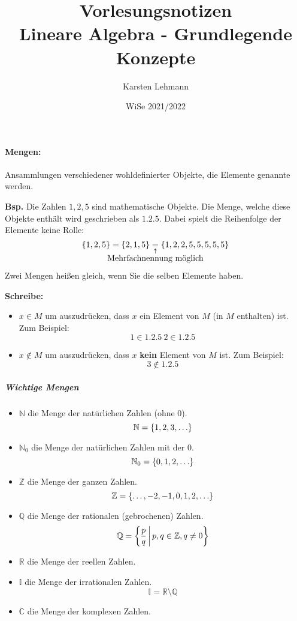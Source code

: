 \documentclass{scrreprt}
\author{Karsten Lehmann}
\date{WiSe 2021/2022}
\title{Vorlesungsnotizen\\Lineare Algebra - Grundlegende Konzepte}
\begin{document}
\paragraph{Mengen:}
Ansammlungen verschiedener wohldefinierter Objekte, die Elemente genannte werden.

\textbf{Bsp.} Die Zahlen $1, 2, 5$ sind mathematische Objekte.
Die Menge, welche diese Objekte enthält wird geschrieben als
$\qty{1, 2, 5}$.
Dabei spielt die Reihenfolge der Elemente keine Rolle:
\[
  \qty{1, 2, 5} = \qty{2, 1, 5}
  \underset{
    \underset{
      \makebox[0pt]{\text{Mehrfachnennung möglich}}
    }\uparrow
  }= \qty{1, 2, 2, 5, 5, 5, 5, 5}
\]
Zwei Mengen heißen gleich, wenn Sie die selben Elemente haben.

\textbf{Schreibe:}
\begin{itemize}
\item $x \in M$ um auszudrücken, dass $x$ ein Element von $M$
  (in $M$ enthalten) ist.
  Zum Beispiel:
  \[
    1 \in \qty{1, 2, 5} \: 2 \in \qty{1, 2, 5}
  \]
\item $x \notin M$ um auszudrücken, dass $x$ \textbf{kein} Element von $M$ ist.
  Zum Beispiel:
  \[
    3 \notin \qty{1, 2, 5}
  \]
\end{itemize}

\subparagraph{Wichtige Mengen}
\begin{itemize}
\item $\mathbb{N}$ die Menge der natürlichen Zahlen (ohne $0$).
  \[
    \mathbb{N} = \qty{1, 2, 3, \ldots}
  \]

\item $\mathbb{N}_0$ die Menge der natürlichen Zahlen mit der $0$.
  \[
    \mathbb{N}_0 = \qty{0, 1, 2, \ldots}
  \]

\item $\mathbb{Z}$ die Menge der ganzen Zahlen.
  \[
    \mathbb{Z} = \qty{\ldots, -2, -1, 0, 1, 2, \ldots}
  \]

\item $\mathbb{Q}$ die Menge der rationalen (gebrochenen) Zahlen.
  \[
    \mathbb{Q} = \qty{\frac{p}{q} \, \middle | \, p, q \in \mathbb{Z}, q \ne 0}
  \]

\item $\mathbb{R}$ die Menge der reellen Zahlen.
\item $\mathbb{I}$ die Menge der irrationalen Zahlen.
  \[
    \mathbb{I} = \mathbb{R} \setminus \mathbb{Q}
  \]

\item $\mathbb{C}$ die Menge der komplexen Zahlen.
\end{itemize}
\end{document}
